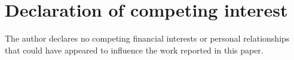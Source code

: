 \section*{Declaration of competing interest}

The author declares no competing financial interests or personal relationships
that could have appeared to influence the work reported in this paper.
